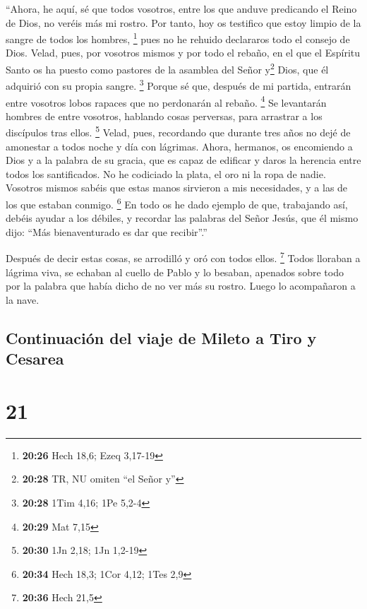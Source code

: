  ``Ahora, he aquí, sé que todos vosotros, entre los que
anduve predicando el Reino de Dios, no veréis más mi rostro.
 Por tanto, hoy os testifico que estoy limpio de la
sangre de todos los hombres, \footnote{\textbf{20:26} Hech 18,6; Ezeq
  3,17-19}  pues no he rehuido declararos todo el consejo
de Dios.  Velad, pues, por vosotros mismos y por todo el
rebaño, en el que el Espíritu Santo os ha puesto como pastores de la
asamblea del Señor y\footnote{\textbf{20:28} TR, NU omiten ``el Señor
  y''} Dios, que él adquirió con su propia sangre. \footnote{\textbf{20:28}
  1Tim 4,16; 1Pe 5,2-4}  Porque sé que, después de mi
partida, entrarán entre vosotros lobos rapaces que no perdonarán al
rebaño. \footnote{\textbf{20:29} Mat 7,15}  Se levantarán
hombres de entre vosotros, hablando cosas perversas, para arrastrar a
los discípulos tras ellos. \footnote{\textbf{20:30} 1Jn 2,18; 1Jn 1,2-19}
 Velad, pues, recordando que durante tres años no dejé de
amonestar a todos noche y día con lágrimas.  Ahora,
hermanos, os encomiendo a Dios y a la palabra de su gracia, que es capaz
de edificar y daros la herencia entre todos los santificados.
 No he codiciado la plata, el oro ni la ropa de nadie.
 Vosotros mismos sabéis que estas manos sirvieron a mis
necesidades, y a las de los que estaban conmigo. \footnote{\textbf{20:34}
  Hech 18,3; 1Cor 4,12; 1Tes 2,9}  En todo os he dado
ejemplo de que, trabajando así, debéis ayudar a los débiles, y recordar
las palabras del Señor Jesús, que él mismo dijo: ``Más bienaventurado es
dar que recibir''.''

 Después de decir estas cosas, se arrodilló y oró con
todos ellos. \footnote{\textbf{20:36} Hech 21,5}  Todos
lloraban a lágrima viva, se echaban al cuello de Pablo y lo besaban,
 apenados sobre todo por la palabra que había dicho de no
ver más su rostro. Luego lo acompañaron a la nave.

\hypertarget{continuaciuxf3n-del-viaje-de-mileto-a-tiro-y-cesarea}{%
\subsection{Continuación del viaje de Mileto a Tiro y
Cesarea}\label{continuaciuxf3n-del-viaje-de-mileto-a-tiro-y-cesarea}}

\hypertarget{section-20}{%
\section{21}\label{section-20}}

